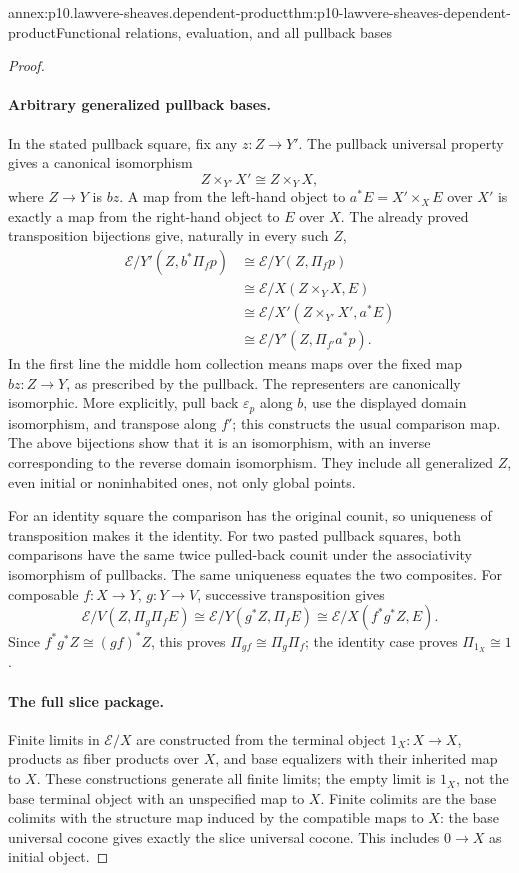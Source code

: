 \begin{annexitem}{annex:p10.lawvere-sheaves.dependent-product}{thm:p10-lawvere-sheaves-dependent-product}{Functional relations, evaluation, and all pullback bases}
\begin{proof}
\paragraph{Arbitrary generalized pullback bases.}
In the stated pullback square, fix any \(z:Z\to Y'\).
The pullback universal property gives a canonical isomorphism
\[
                Z\times_{Y'}X'\cong Z\times_Y X,
\]
where \(Z\to Y\) is \(bz\).  A map from the left-hand
object to \(a^*E=X'\times_XE\) over \(X'\) is exactly
a map from the right-hand object to \(E\) over \(X\).
The already proved transposition bijections give, naturally in
every such \(Z\),
\[
\begin{aligned}
 \mathcal E/Y'(Z,b^*\Pi_fp)
 &\cong\mathcal E/Y(Z,\Pi_fp)\\
 &\cong\mathcal E/X(Z\times_YX,E)\\
 &\cong\mathcal E/X'(Z\times_{Y'}X',a^*E)\\
 &\cong\mathcal E/Y'(Z,\Pi_{f'}a^*p).
\end{aligned}
\]
In the first line the middle hom collection means maps over the
fixed map \(bz:Z\to Y\), as prescribed by the pullback.
The representers are canonically isomorphic.  More explicitly,
pull back \(\varepsilon_p\) along \(b\), use the displayed
domain isomorphism, and transpose along \(f'\); this constructs
the usual comparison map.  The above bijections show that it is
an isomorphism, with an inverse corresponding to the reverse
domain isomorphism.  They include all generalized \(Z\), even
initial or noninhabited ones, not only global points.

For an identity square the comparison has the original counit,
so uniqueness of transposition makes it the identity.  For two
pasted pullback squares, both comparisons have the same twice
pulled-back counit under the associativity isomorphism of
pullbacks.  The same uniqueness equates the two composites.
For composable \(f:X\to Y\), \(g:Y\to V\), successive
transposition gives
\[
 \mathcal E/V(Z,\Pi_g\Pi_fE)
 \cong\mathcal E/Y(g^*Z,\Pi_fE)
 \cong\mathcal E/X(f^*g^*Z,E).
\]
Since \(f^*g^*Z\cong(gf)^*Z\), this proves
\(\Pi_{gf}\cong\Pi_g\Pi_f\); the identity case proves
\(\Pi_{1_X}\cong1\).

\paragraph{The full slice package.}
Finite limits in \(\mathcal E/X\) are constructed from the
terminal object \(1_X:X\to X\), products as fiber products
over \(X\), and base equalizers with their inherited map to
\(X\).  These constructions generate all finite limits;
the empty limit is \(1_X\), not the base terminal object
with an unspecified map to \(X\).  Finite colimits are the base colimits with the
structure map induced by the compatible maps to \(X\):
the base universal cocone gives exactly the slice universal
cocone.  This includes \(0\to X\) as initial object.


\end{proof}
\end{annexitem}
